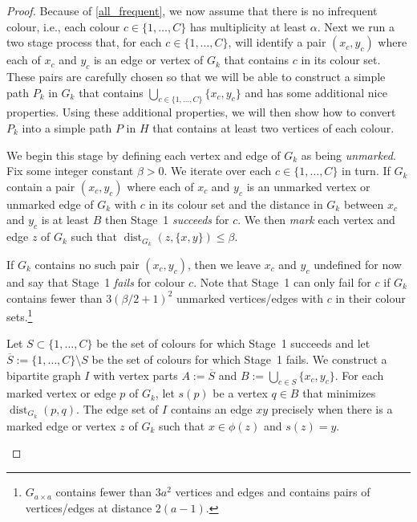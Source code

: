\documentclass{patmorin}
\DeclareMathOperator{\dist}{dist}
\begin{document}
\begin{proof}
  Because of \cref{all_frequent}, we now assume that there is no infrequent colour, i.e., each colour $c\in\{1,\ldots,C\}$ has multiplicity at least $\alpha$.  Next we run a two stage process that, for each $c\in\{1,\ldots,C\}$, will identify a pair $(x_c,y_c)$ where each of $x_c$ and $y_c$ is an edge or vertex of $G_k$ that contains $c$ in its colour set.  These pairs are carefully chosen so that we will be able to construct a simple path $P_k$ in $G_k$ that contains $\bigcup_{c\in\{1,\ldots,C\}} \{x_c,y_c\}$ and has some additional nice properties.  Using these additional properties, we will then show how to convert $P_k$ into a simple path $P$ in $H$ that contains at least two vertices of each colour.

  \begin{compactenum}[{Stage} 1:]
    \item We begin this stage by defining each vertex and edge of $G_k$ as being \emph{unmarked}.  Fix some integer constant $\beta>0$.  We iterate over each $c\in\{1,\ldots,C\}$ in turn.  If $G_k$ contain a pair $(x_c,y_c)$ where each of $x_c$ and $y_c$ is an unmarked vertex or unmarked edge of $G_k$ with $c$ in its colour set and the distance in $G_k$ between $x_c$ and $y_c$ is at least $B$ then Stage~1 \emph{succeeds} for $c$.  We then \emph{mark} each vertex and edge $z$ of $G_k$ such that $\dist_{G_k}(z, \{x,y\})\le \beta$.

    If $G_k$ contains no such pair $(x_c,y_c)$, then we leave $x_c$ and $y_c$ undefined for now and say that Stage~1 \emph{fails} for colour $c$.  Note that Stage~1 can only fail for $c$ if $G_k$ contains fewer than $3(\beta/2+1)^2$ unmarked vertices/edges with $c$ in their colour sets.\footnote{$G_{a\times a}$ contains fewer than $3a^2$ vertices and edges and contains pairs of vertices/edges at distance $2(a-1)$.}

    \item Let $S\subset\{1,\ldots,C\}$ be the set of colours for which Stage~1 succeeds and let $\overline{S}:=\{1,\ldots,C\}\setminus S$ be the set of colours for which Stage~1 fails.  We construct a bipartite graph $I$ with vertex parts $A:=\overline{S}$ and $B:=\bigcup_{c\in S}\{x_c,y_c\}$.   For each marked vertex or edge $p$ of $G_k$, let $s(p)$ be a vertex $q\in B$ that minimizes $\dist_{G_k}(p,q)$.  The edge set of $I$ contains an edge $xy$ precisely when there is a marked edge or vertex $z$ of $G_k$ such that $x\in\phi(z)$ and $s(z)=y$.


\end{compactenum}
\end{proof}
\end{document}
